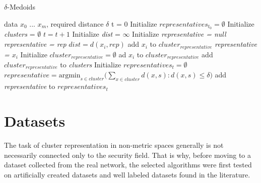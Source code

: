 \documentclass[thesis=B,english]{FITthesis}[2012/10/20]
\begin{document}
\begin{algorithm}\label{alg:delta_medoids_full}
    \caption{$\delta$-Medoids}
    \label{delta_medoids_full}
    \begin{algorithmic}[1]
        \INPUT data $x_0$ ... $x_m$, required distance $\delta$
        \STATE t = 0
        \STATE Initialize $representatives_{t_0} = \emptyset$
        \STATE Initialize \textit{clusters} = $\emptyset$
        \DO
            \STATE $t = t + 1$
                \STATE Initialize \textit{dist} = $\infty$
                \STATE Initialize \textit{representative = null}
                        \STATE \textit{representative = rep}
                        \STATE $dist = d(x_i, rep)$
                    \ENDIF
                \ENDFOR
                    \STATE add $x_i$ to $cluster_{representative}$
                \ELSE
                    \STATE \textit{representative = $x_i$}
                    \STATE Initialize $cluster_{representative} = \emptyset$
                    \STATE ad $x_i$ to $cluster_{representative}$
                    \STATE add $cluster_{representative}$ to \textit{clusters}
                \ENDIF
            \ENDFOR
            \STATE Initialize $representatives_t = \emptyset$
                \STATE $representative = \textrm{argmin}_{s \in cluster} (\sum\limits_{x \in cluster}{d(x,s) : d(x,s) \le \delta)}$
                \STATE add \textit{representative} to $representatives_t$
            \ENDFOR
    \end{algorithmic}
\end{algorithm}


\chapter{Datasets}\label{ch:datasets}

The task of cluster representation in non-metric spaces generally is not necessarily connected only to the security field.
That is why, before moving to a dataset collected from the real network, the selected algorithms were first tested on artificially created datasets and well labeled datasets found in the literature.
\end{document}
